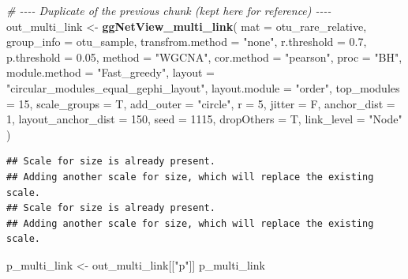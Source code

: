 \documentclass[
]{book}
\newenvironment{Shaded}{\begin{snugshade}}{\end{snugshade}}
\newcommand{\AttributeTok}[1]{\textcolor[rgb]{0.13,0.29,0.53}{#1}}
\newcommand{\CommentTok}[1]{\textcolor[rgb]{0.56,0.35,0.01}{\textit{#1}}}
\newcommand{\DecValTok}[1]{\textcolor[rgb]{0.00,0.00,0.81}{#1}}
\newcommand{\FloatTok}[1]{\textcolor[rgb]{0.00,0.00,0.81}{#1}}
\newcommand{\FunctionTok}[1]{\textcolor[rgb]{0.13,0.29,0.53}{\textbf{#1}}}
\newcommand{\NormalTok}[1]{#1}
\newcommand{\OtherTok}[1]{\textcolor[rgb]{0.56,0.35,0.01}{#1}}
\newcommand{\StringTok}[1]{\textcolor[rgb]{0.31,0.60,0.02}{#1}}
\begin{document}
\begin{Shaded}
\begin{Highlighting}[]
\CommentTok{\# {-}{-}{-}{-} Duplicate of the previous chunk (kept here for reference) {-}{-}{-}{-}}
\NormalTok{out\_multi\_link }\OtherTok{\textless{}{-}} \FunctionTok{ggNetView\_multi\_link}\NormalTok{(}
  \AttributeTok{mat                 =}\NormalTok{ otu\_rare\_relative,}
  \AttributeTok{group\_info          =}\NormalTok{ otu\_sample,}
  \AttributeTok{transfrom.method    =} \StringTok{"none"}\NormalTok{,}
  \AttributeTok{r.threshold         =} \FloatTok{0.7}\NormalTok{,}
  \AttributeTok{p.threshold         =} \FloatTok{0.05}\NormalTok{,}
  \AttributeTok{method              =} \StringTok{"WGCNA"}\NormalTok{,}
  \AttributeTok{cor.method          =} \StringTok{"pearson"}\NormalTok{,}
  \AttributeTok{proc                =} \StringTok{"BH"}\NormalTok{,}
  \AttributeTok{module.method       =} \StringTok{"Fast\_greedy"}\NormalTok{,}
  \AttributeTok{layout              =} \StringTok{"circular\_modules\_equal\_gephi\_layout"}\NormalTok{,}
  \AttributeTok{layout.module       =} \StringTok{"order"}\NormalTok{,}
  \AttributeTok{top\_modules         =} \DecValTok{15}\NormalTok{,}
  \AttributeTok{scale\_groups        =}\NormalTok{ T,}
  \AttributeTok{add\_outer           =} \StringTok{"circle"}\NormalTok{,}
  \AttributeTok{r                   =} \DecValTok{5}\NormalTok{,}
  \AttributeTok{jitter              =}\NormalTok{ F,}
  \AttributeTok{anchor\_dist         =} \DecValTok{1}\NormalTok{,}
  \AttributeTok{layout\_anchor\_dist  =} \DecValTok{150}\NormalTok{,}
  \AttributeTok{seed                =} \DecValTok{1115}\NormalTok{,}
  \AttributeTok{dropOthers          =}\NormalTok{ T,}
  \AttributeTok{link\_level          =} \StringTok{"Node"}
\NormalTok{)}
\end{Highlighting}
\end{Shaded}

\begin{verbatim}
## Scale for size is already present.
## Adding another scale for size, which will replace the existing scale.
## Scale for size is already present.
## Adding another scale for size, which will replace the existing scale.
\end{verbatim}

\begin{Shaded}
\begin{Highlighting}[]
\NormalTok{p\_multi\_link }\OtherTok{\textless{}{-}}\NormalTok{ out\_multi\_link[[}\StringTok{"p"}\NormalTok{]]}
\NormalTok{p\_multi\_link}
\end{Highlighting}
\end{Shaded}
\end{document}
